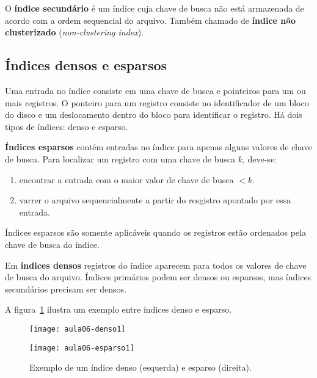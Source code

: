 O \textbf{índice secundário} é um índice cuja chave de busca não está armazenada
de acordo com a ordem sequencial do arquivo.
Também chamado de \textbf{índice não clusterizado} (\emph{non-clustering index}).

\subsection{Índices densos e esparsos}

Uma entrada no índice consiste em uma chave de busca e pointeiros para um ou mais registros.
O ponteiro para um registro consiste no identificador de um bloco do disco e um deslocamento
dentro do bloco para identificar o registro.
Há dois tipos de índices: denso e esparso.

\textbf{Índices esparsos} contém entradas no índice para apenas alguns valores de chave de busca.
Para localizar um registro com uma chave de busca $k$, deve-se:
\begin{enumerate}
\item encontrar a entrada com o maior valor de chave de busca $< k$.
\item varrer o arquivo sequencialmente a partir do resgistro apontado por essa entrada.
\end{enumerate}
Índices esparsos são somente aplicáveis quando os registros estão ordenados pela chave
de busca do índice.

Em \textbf{índices densos} registros do índice aparecem para todos os valores
de chave de busca do arquivo.
Índices primários podem ser densos ou esparsos, mas índices secundários
precisam ser densos.

A figura~\ref{aula06:fig:denso:esparso} ilustra um exemplo entre índices denso e esparso.
%
\begin{figure}[!htb]
\centering
  \begin{minipage}{0.45\textwidth}
	\centering
	\texttt{[image: aula06-denso1]}
  \end{minipage}
  \begin{minipage}{0.45\textwidth}
	\centering
	\texttt{[image: aula06-esparso1]}
  \end{minipage}
\caption{Exemplo de um índice denso (esquerda) e esparso (direita).}
\label{aula06:fig:denso:esparso}
\end{figure}

